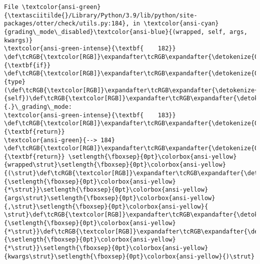 \documentclass[11pt]{article}
\begin{document}
\begin{Verbatim}[commandchars=\\\{\}, frame=single, framerule=2mm, rulecolor=\color{outerrorbackground}]
File \textcolor{ansi-green}{\textasciitilde{}/Library/Python/3.9/lib/python/site-packages/otter/check/utils.py:184}, in \textcolor{ansi-cyan}{grading\_mode\_disabled}\textcolor{ansi-blue}{(wrapped, self, args, kwargs)}
\textcolor{ansi-green-intense}{\textbf{    182}} \def\tcRGB{\textcolor[RGB]}\expandafter\tcRGB\expandafter{\detokenize{0,135,0}}{\textbf{if}} \def\tcRGB{\textcolor[RGB]}\expandafter\tcRGB\expandafter{\detokenize{0,135,0}}{type}(\def\tcRGB{\textcolor[RGB]}\expandafter\tcRGB\expandafter{\detokenize{0,135,0}}{self})\def\tcRGB{\textcolor[RGB]}\expandafter\tcRGB\expandafter{\detokenize{98,98,98}}{.}\_grading\_mode:
\textcolor{ansi-green-intense}{\textbf{    183}}     \def\tcRGB{\textcolor[RGB]}\expandafter\tcRGB\expandafter{\detokenize{0,135,0}}{\textbf{return}}
\textcolor{ansi-green}{--> 184} \def\tcRGB{\textcolor[RGB]}\expandafter\tcRGB\expandafter{\detokenize{0,135,0}}{\textbf{return}} \setlength{\fboxsep}{0pt}\colorbox{ansi-yellow}{wrapped\strut}\setlength{\fboxsep}{0pt}\colorbox{ansi-yellow}{(\strut}\def\tcRGB{\textcolor[RGB]}\expandafter\tcRGB\expandafter{\detokenize{98,98,98}}{\setlength{\fboxsep}{0pt}\colorbox{ansi-yellow}{*\strut}}\setlength{\fboxsep}{0pt}\colorbox{ansi-yellow}{args\strut}\setlength{\fboxsep}{0pt}\colorbox{ansi-yellow}{,\strut}\setlength{\fboxsep}{0pt}\colorbox{ansi-yellow}{ \strut}\def\tcRGB{\textcolor[RGB]}\expandafter\tcRGB\expandafter{\detokenize{98,98,98}}{\setlength{\fboxsep}{0pt}\colorbox{ansi-yellow}{*\strut}}\def\tcRGB{\textcolor[RGB]}\expandafter\tcRGB\expandafter{\detokenize{98,98,98}}{\setlength{\fboxsep}{0pt}\colorbox{ansi-yellow}{*\strut}}\setlength{\fboxsep}{0pt}\colorbox{ansi-yellow}{kwargs\strut}\setlength{\fboxsep}{0pt}\colorbox{ansi-yellow}{)\strut}


\end{Verbatim}
\end{document}
